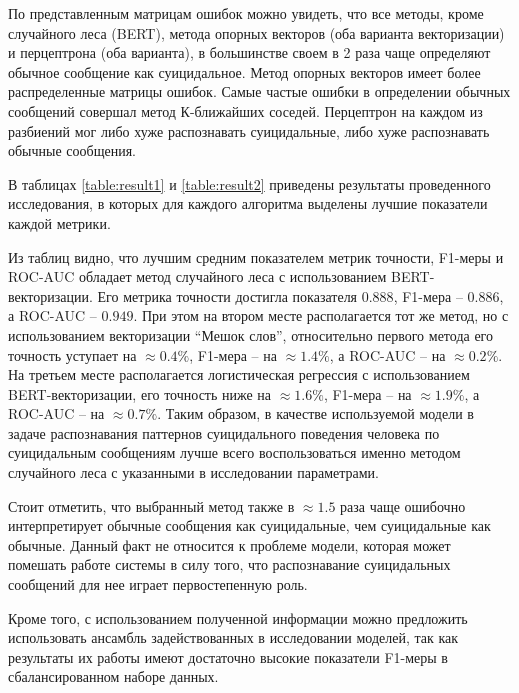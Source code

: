 По представленным матрицам ошибок можно увидеть, что все методы, кроме случайного леса (BERT), метода опорных векторов (оба варианта векторизации) и перцептрона (оба варианта), в большинстве своем в 2 раза чаще определяют обычное сообщение как суицидальное. Метод опорных векторов имеет более распределенные матрицы ошибок. Самые частые ошибки в определении обычных сообщений совершал метод К-ближайших соседей. Перцептрон на каждом из разбиений мог либо хуже распознавать суицидальные, либо хуже распознавать обычные сообщения.

В таблицах \ref{table:result1} и \ref{table:result2} приведены результаты проведенного исследования, в которых для каждого алгоритма выделены лучшие показатели каждой метрики.

Из таблиц видно, что лучшим средним показателем метрик точности, F1-меры и ROC-AUC обладает метод случайного леса с использованием BERT-векторизации.
Его метрика точности достигла показателя $0.888$, F1-мера -- $0.886$, а ROC-AUC -- $0.949$.
При этом на втором месте располагается тот же метод, но с использованием векторизации ``Мешок слов'', относительно первого метода его точность уступает на $\approx 0.4\%$, F1-мера -- на $\approx 1.4\%$, а ROC-AUC -- на $\approx 0.2\%$. 
На третьем месте располагается логистическая регрессия с использованием BERT-векторизации, его точность ниже на $\approx 1.6\%$, F1-мера -- на $\approx 1.9\%$, а ROC-AUC -- на $\approx 0.7\%$. 
Таким образом, в качестве используемой модели в задаче распознавания паттернов суицидального поведения человека по суицидальным сообщениям лучше всего воспользоваться именно методом случайного леса с указанными в исследовании параметрами.

Стоит отметить, что выбранный метод также в $\approx 1.5$ раза чаще ошибочно интерпретирует обычные сообщения как суицидальные, чем суицидальные как обычные. Данный факт не относится к проблеме модели, которая может помешать работе системы в силу того, что распознавание суицидальных сообщений для нее играет первостепенную роль.

Кроме того, с использованием полученной информации можно предложить использовать ансамбль задействованных в исследовании моделей, так как результаты их работы имеют достаточно высокие показатели F1-меры в сбалансированном наборе данных.

